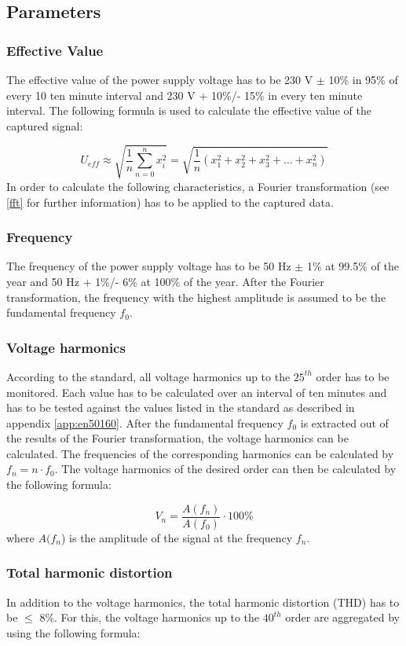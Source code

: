 \subsection{Parameters}
\subsubsection{Effective Value}
The effective value of the power supply voltage has to be 230 V $\pm$ 10\% in 95\% of every 10 ten minute interval and 230 V + 10\%/- 15\% in every ten minute interval.
The following formula is used to calculate the effective value of the captured signal:

\[ U_{eff} \approx \sqrt{\frac{1}{n} \sum_{n=0}^n x_i^2 } = \sqrt{\frac{1}{n} (x_1^2 + x_2^2 + x_3^2 + \dots + x_n^2)} \]
\newline
In order to calculate the following characteristics, a Fourier transformation (see \ref{fft} for further information) has to be applied to the captured data.

\subsubsection{Frequency}
The frequency of the power supply voltage has to be 50 Hz $\pm$ 1\% at 99.5\% of the year and 50 Hz + 1\%/- 6\% at 100\% of the year. After the Fourier transformation, the frequency with the highest amplitude is assumed to be the fundamental frequency $f_0$.

\subsubsection{Voltage harmonics}
According to the standard, all voltage harmonics up to the $25^{th}$ order has to be monitored. Each value has to be calculated over an interval of ten minutes and has to be tested against the values listed in the standard as described in appendix \ref{app:en50160}. After the fundamental frequency $f_0$ is extracted out of the results of the Fourier transformation, the voltage harmonics can be calculated. The frequencies of the corresponding harmonics can be calculated by $f_n = n \cdot f_0$. The voltage harmonics of the desired order can then be calculated by the following formula:

\[ V_n = \frac{A(f_n)}{A(f_0)} \cdot 100\% \]
\newline
where $A(f_n$) is the amplitude of the signal at the frequency $f_n$.

\subsubsection{Total harmonic distortion}
In addition to the voltage harmonics, the total harmonic distortion (THD) has to be $\leq$ 8\%. For this, the voltage harmonics up to the $40^{th}$ order are aggregated by using the following formula: 

